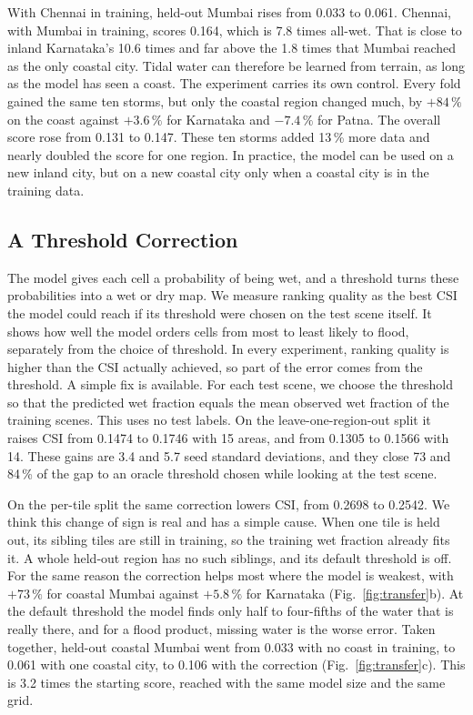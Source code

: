 \documentclass[conference]{IEEEtran}
\begin{document}
With Chennai in training, held-out Mumbai rises from 0.033 to 0.061. Chennai, with Mumbai in
training, scores 0.164, which is 7.8 times all-wet. That is close to inland Karnataka's 10.6 times
and far above the 1.8 times that Mumbai reached as the only coastal city. Tidal water can therefore
be learned from terrain, as long as the model has seen a coast. The experiment carries its own
control. Every fold gained the same ten storms, but only the coastal region changed much, by
$+84\,\%$ on the coast against $+3.6\,\%$ for Karnataka and $-7.4\,\%$ for Patna. The overall score
rose from 0.131 to 0.147. These ten storms added 13\,\% more data and nearly doubled the score for
one region. In practice, the model can be used on a new inland city, but on a new coastal city only
when a coastal city is in the training data.

\subsection{A Threshold Correction}
The model gives each cell a probability of being wet, and a threshold turns these probabilities into
a wet or dry map. We measure ranking quality as the best CSI the model could reach if its threshold
were chosen on the test scene itself. It shows how well the model orders cells from most to least
likely to flood, separately from the choice of threshold. In every experiment, ranking quality is
higher than the CSI actually achieved, so part of the error comes from the threshold. A simple fix
is available. For each test scene, we choose the threshold so that the predicted wet fraction equals
the mean observed wet fraction of the training scenes. This uses no test labels. On the
leave-one-region-out split it raises CSI from 0.1474 to 0.1746 with 15 areas, and from 0.1305 to
0.1566 with 14. These gains are 3.4 and 5.7 seed standard deviations, and they close 73 and 84\,\%
of the gap to an oracle threshold chosen while looking at the test scene.

On the per-tile split the same correction lowers CSI, from 0.2698 to 0.2542. We think this change of
sign is real and has a simple cause. When one tile is held out, its sibling tiles are still in
training, so the training wet fraction already fits it. A whole held-out region has no such
siblings, and its default threshold is off. For the same reason the correction helps most where the
model is weakest, with $+73\,\%$ for coastal Mumbai against $+5.8\,\%$ for Karnataka
(Fig.~\ref{fig:transfer}b). At the default threshold the model finds only half to four-fifths of the
water that is really there, and for a flood product, missing water is the worse error. Taken
together, held-out coastal Mumbai went from 0.033 with no coast in training, to 0.061 with one
coastal city, to 0.106 with the correction (Fig.~\ref{fig:transfer}c). This is 3.2 times the
starting score, reached with the same model size and the same grid.
\end{document}

